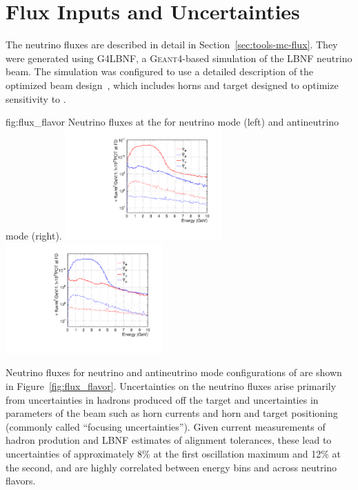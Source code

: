 \section{Flux Inputs and Uncertainties}\label{sec:nu-osc-04}
\label{sec:physics-lbnosc-flux}

The neutrino fluxes are described in detail in Section~\ref{sec:tools-mc-flux}.  They were generated using G4LBNF, a \textsc{Geant}4\xspace-based simulation of the LBNF neutrino beam.  The simulation was configured to use a detailed description of the  optimized beam design~\cite{optimizedbeamcdr}, which includes horns and target designed to optimize sensitivity to .   

\begin{dunefigure}{fig:flux_flavor}
{Neutrino fluxes at the  for neutrino mode (left) and
antineutrino mode (right). }
    \includegraphics[width=0.45\textwidth]{graphics/dune_neutrino_fd_log.pdf}
     \includegraphics[width=0.45\textwidth]{graphics/dune_antineutrino_fd_log.pdf}
\end{dunefigure}

Neutrino fluxes for neutrino and antineutrino mode configurations of  are shown in Figure~\ref{fig:flux_flavor}.   Uncertainties on the neutrino fluxes arise primarily from uncertainties in hadrons produced off the target and uncertainties in parameters of the beam such as horn currents and horn and target positioning (commonly called ``focusing uncertainties''). Given current measurements of hadron prodution and LBNF estimates of alignment tolerances, these lead to uncertainties of approximately 8\% at the first oscillation maximum and 12\% at the second, and are highly correlated between energy bins and across neutrino flavors.       

